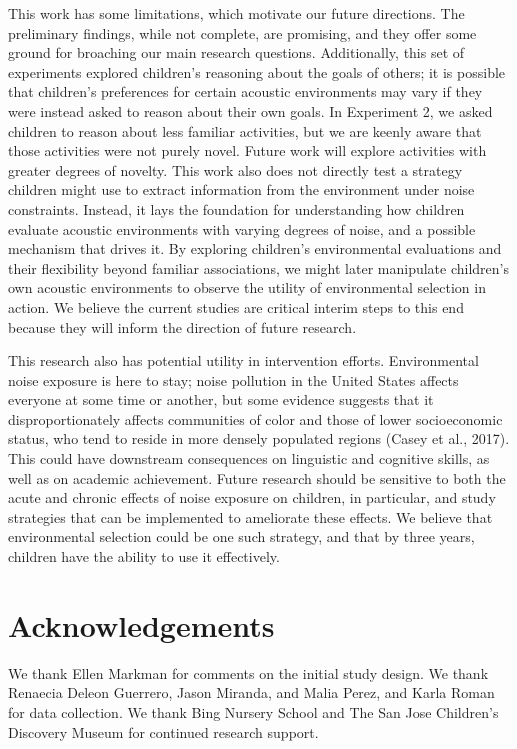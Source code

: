 \documentclass[10pt, letterpaper]{article}
\begin{document}
This work has some limitations, which motivate our future directions.
The preliminary findings, while not complete, are promising, and they
offer some ground for broaching our main research questions.
Additionally, this set of experiments explored children's reasoning
about the goals of others; it is possible that children's preferences
for certain acoustic environments may vary if they were instead asked to
reason about their own goals. In Experiment 2, we asked children to
reason about less familiar activities, but we are keenly aware that
those activities were not purely novel. Future work will explore
activities with greater degrees of novelty. This work also does not
directly test a strategy children might use to extract information from
the environment under noise constraints. Instead, it lays the foundation
for understanding how children evaluate acoustic environments with
varying degrees of noise, and a possible mechanism that drives it. By
exploring children's environmental evaluations and their flexibility
beyond familiar associations, we might later manipulate children's own
acoustic environments to observe the utility of environmental selection
in action. We believe the current studies are critical interim steps to
this end because they will inform the direction of future research.

This research also has potential utility in intervention efforts.
Environmental noise exposure is here to stay; noise pollution in the
United States affects everyone at some time or another, but some
evidence suggests that it disproportionately affects communities of
color and those of lower socioeconomic status, who tend to reside in
more densely populated regions (Casey et al., 2017). This could have
downstream consequences on linguistic and cognitive skills, as well as
on academic achievement. Future research should be sensitive to both the
acute and chronic effects of noise exposure on children, in particular,
and study strategies that can be implemented to ameliorate these
effects. We believe that environmental selection could be one such
strategy, and that by three years, children have the ability to use it
effectively.

\hypertarget{acknowledgements}{%
\section{Acknowledgements}\label{acknowledgements}}

We thank Ellen Markman for comments on the initial study design. We
thank Renaecia Deleon Guerrero, Jason Miranda, and Malia Perez, and
Karla Roman for data collection. We thank Bing Nursery School and The
San Jose Children's Discovery Museum for continued research support.
\end{document}
